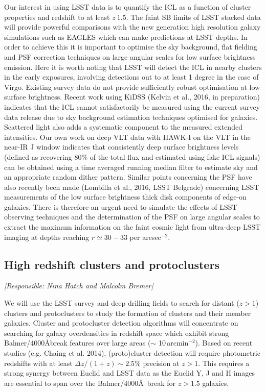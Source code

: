 \documentclass[a4paper,11pt]{article}
\begin{document}
Our interest in using LSST data is to quantify the ICL as a function
of cluster properties and redshift to at least $z~1.5$. The faint SB
limits of LSST stacked data will provide powerful comparisons with the
new generation high resolution galaxy simulations such as EAGLES which
can make predictions at LSST depths. In order to achieve this it is
important to optimise the sky background, flat fielding and PSF
correction techniques on large angular scales for low surface
brightness emission. Here it is worth noting that LSST will detect the
ICL in nearby clusters in the early exposures, involving detections
out to at least 1 degree in the case of Virgo. Existing survey data do
not provide sufficiently robust optimisation at low surface
brightness. Recent work using KiDSS (Kelvin et al., 2016, in
preparation) indicates that the ICL cannot satisfactorily be measured
using the current survey data release due to sky background estimation
techniques optimised for galaxies. Scattered light also adds a
systematic component to the measured extended intensities. Our own
work on deep VLT data with HAWK-I on the VLT in the near-IR J window
indicates that consistently deep surface brightness levels (defined as
recovering $80\%$ of the total flux and estimated using fake ICL
signals) can be obtained using a time averaged running median filter
to estimate sky and an appropriate random dither pattern. Similar
points concerning the PSF have also recently been made (Lombilla et
al., 2016, LSST Belgrade) concerning LSST measurements of the low
surface brightness thick disk components of edge-on galaxies. There is
therefore an urgent need to simulate the effects of LSST observing
techniques and the determination of the PSF on large angular scales to
extract the maximum information on the faint cosmic light from
ultra-deep LSST imaging at depths reaching $r \simeq 30-33$ per
arcsec$^{-2}$.

\subsection{High redshift clusters and protoclusters}

{\it [Responsible: Nina Hatch and Malcolm Bremer]}

\noindent We will use the LSST survey and deep drilling fields to
search for distant ($z >1$) clusters and protoclusters to study the
formation of clusters and their member galaxies. Cluster and
protocluster detection algorithms will concentrate on searching for
galaxy overdensities in redshift space which exhibit strong
Balmer/4000\AA break features over large areas ($\sim$
10\,arcmin$^{-2}$). Based on recent studies (e.g. Chaing et al. 2014),
(proto)cluster detection will require photometric redshifts with at
least $\Delta z/ (1+z)\sim2.5$\% precision at $z>1$. This requires a
strong synergy between Euclid and LSST data as the Euclid Y, J and H
images are essential to span over the Balmer/4000\AA\ break for
$z>1.5$ galaxies.
\end{document}
